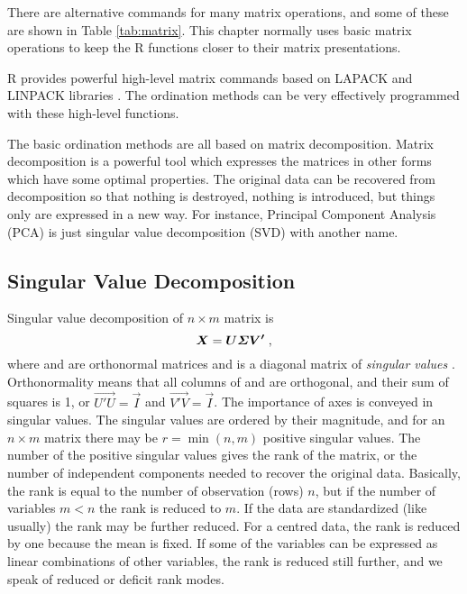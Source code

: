  There are alternative commands for many matrix operations, and some
 of these are shown in Table \ref{tab:matrix}. This chapter normally
 uses basic matrix operations to keep the R functions closer to their
 matrix presentations.

R provides powerful high-level matrix commands
based on LAPACK and LINPACK libraries \citep{LAPACK, LINPACK}. The
ordination methods can be very effectively programmed with these
high-level functions.

The basic ordination methods are all based on
matrix decomposition. Matrix decomposition is a powerful tool which
expresses the matrices in other forms which have some optimal
properties. The original data can be recovered from decomposition so
that nothing is destroyed, nothing is introduced, but things only are
expressed in a new way.  For instance, Principal Component Analysis
(PCA) is just singular value decomposition (SVD) with another name.

\subsection{Singular Value Decomposition}

Singular value decomposition of $n \times m$ matrix  is
\begin{equation}
  \label{eq:svd}
  \vec{X} = \vec{U \bSigma V'}\;,
\end{equation}
where  and  are orthonormal matrices and \vec{\bSigma}
is a diagonal matrix of \emph{singular values} \citep{Mard79}.
Orthonormality means that all columns of  and  are
orthogonal, and their sum of squares is 1, or $\vec{U'U} = \vec{I}$
and $\vec{V'V} = \vec{I}$. The importance of axes is conveyed in
singular values. The singular values are ordered by their magnitude,
and for an $n \times m$ matrix there may be $r = \min(n, m)$ positive
singular values. The number of the positive singular values gives the
rank of the matrix, or the number of independent components needed to
recover the original data. Basically, the rank is equal to the number
of observation (rows) $n$, but if the number of variables $m < n$ the
rank is reduced to $m$. If the data are standardized (like usually)
the rank may be further reduced. For a centred data, the rank is
reduced by one because the mean is fixed. If some of the variables can
be expressed as linear combinations of other variables, the rank is
reduced still further, and we speak of reduced or deficit rank modes.

